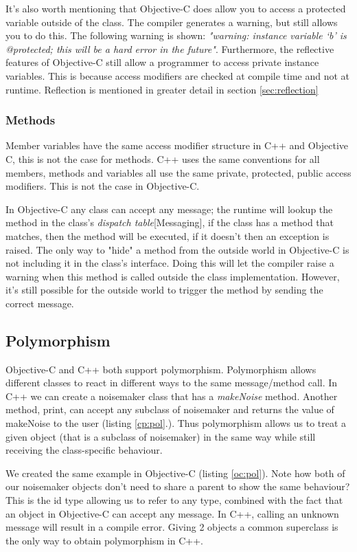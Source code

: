 \documentclass[12pt, a4paper, twocolumn]{article}
\begin{document}
It's also worth mentioning that Objective-C does allow you to access a protected variable outside of the class. The compiler generates a warning, but still allows you to do this. The following warning is shown: 
\textit{"warning: instance variable ‘b’ is @protected; this will be a hard error in the future"}.
Furthermore, the reflective features of Objective-C still allow a programmer to access private instance variables. This is because access modifiers are checked at compile time and not at runtime. Reflection is mentioned in greater detail in section \ref{sec:reflection}

\subsubsection{Methods}
Member variables have the same access modifier structure in C++ and Objective C, this is not the case for methods. C++ uses the same conventions for all members, methods and variables all use the same private, protected, public access modifiers. This is not the case in Objective-C. 

In Objective-C any class can accept any message; the runtime will lookup the method in the class's \textit{dispatch table}\cite{OCRPG}[Messaging], if the class has a method that matches, then the method will be executed, if it doesn't then an exception is raised. The only way to "hide" a method from the outside world in Objective-C is not including it in the class's interface. Doing this will let the compiler raise a warning when this method is called outside the class implementation. However, it's still possible for the outside world to trigger the method by sending the correct message.

\subsection{Polymorphism}
\label{sec:polymorphism}

Objective-C and C++ both support polymorphism. Polymorphism allows different classes to react in different ways to the same message/method call. In C++ we can create a noisemaker class that has a \textit{makeNoise} method. Another method, print, can accept any subclass of noisemaker and returns the value of makeNoise to the user (listing \ref{cp:pol}.). 
Thus polymorphism allows us to treat a given object (that is a subclass of noisemaker) in the same way while still receiving the class-specific behaviour.

We created the same example in Objective-C (listing \ref{oc:pol}). Note how both of our noisemaker objects don't need to share a parent to show the same behaviour? This is the id type allowing us to refer to any type, combined with the fact that an object in Objective-C can accept any message. In C++, calling an unknown message will result in a compile error. Giving 2 objects a common superclass is the only way to obtain polymorphism in C++. 
\end{document}

